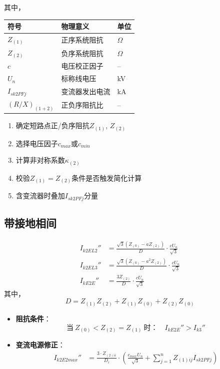 \documentclass[a4paper,11pt,AutoFakeBold]{ctexart}
\begin{document}
其中，
\begin{tabular}{lll}
符号 & 物理意义 & 单位 \\
\hline
$Z_{(1)}$ & 正序系统阻抗 & $\Omega$ \\
$Z_{(2)}$ & 负序系统阻抗 & $\Omega$ \\
$c$ & 电压校正因子 & -- \\
$U_n$ & 标称线电压 & \si{kV} \\
$I_{sk2PFj}$ & 变流器发出电流 & \si{kA} \\
$(R/X)_{(1+2)}$ & 正负序阻抗比 & -- \\
\end{tabular}

\begin{enumerate}
\item 确定短路点正/负序阻抗$Z_{(1)}$, $Z_{(2)}$
\item 选择电压因子$c_{max}$或$c_{min}$
\item 计算非对称系数$\kappa_{(2)}$
\item 校验$Z_{(1)}=Z_{(2)}$条件是否触发简化计算
\item 含变流器时叠加$I_{sk2PFj}$分量
\end{enumerate}


\subsection{带接地相间}

\begin{align}
I_{k2EL2}'' &= \frac{\sqrt{3}(Z_{(0)} - aZ_{(2)})}{D} \cdot \frac{cU_n}{\sqrt{3}} \label{eq:ik2el2} \\
I_{k2EL3}'' &= \frac{\sqrt{3}(Z_{(0)} - a^2Z_{(2)})}{D} \cdot \frac{cU_n}{\sqrt{3}} \label{eq:ik2el3} \\
I_{kE2E}'' &= \frac{3Z_{(2)}}{D} \cdot \frac{cU_n}{\sqrt{3}} \label{eq:ike2e}
\end{align}
其中，
\[ D = Z_{(1)}Z_{(2)} + Z_{(1)}Z_{(0)} + Z_{(2)}Z_{(0)} \]


\begin{itemize}
\item \textbf{阻抗条件}：
  \[ \text{当}\ Z_{(0)} < Z_{(2)} = Z_{(1)}\ \text{时：} \quad I_{kE2E}'' > I_{k3}'' \]
  
\item \textbf{变流电源修正}：
  \begin{align}
  I_{k2E2max}'' &= \frac{3\cdot Z_{(2)ii}}{D_i} \cdot (\frac{c_{max}U_n}{\sqrt{3}} + \sum_{j=1}^{n}Z_{(1)ij}I_{sk2PFj}) \label{eq:ik2el2max}
  \end{align}
\end{itemize}
\end{document}
